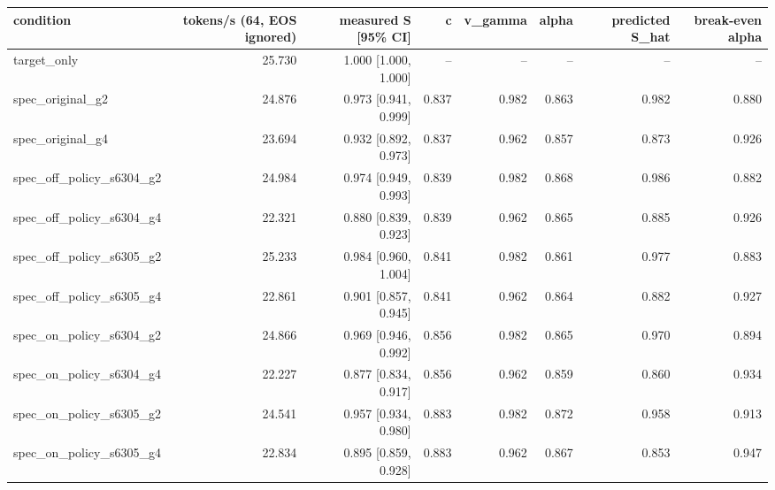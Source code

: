 \begin{tabular}{lrrrrrrr}
\toprule
condition & tokens/s (64, EOS ignored) & measured S [95\% CI] & c & v\_gamma & alpha & predicted S\_hat & break-even alpha \\
\midrule
target\_only & 25.730 & 1.000 [1.000, 1.000] & -- & -- & -- & -- & -- \\
spec\_original\_g2 & 24.876 & 0.973 [0.941, 0.999] & 0.837 & 0.982 & 0.863 & 0.982 & 0.880 \\
spec\_original\_g4 & 23.694 & 0.932 [0.892, 0.973] & 0.837 & 0.962 & 0.857 & 0.873 & 0.926 \\
spec\_off\_policy\_s6304\_g2 & 24.984 & 0.974 [0.949, 0.993] & 0.839 & 0.982 & 0.868 & 0.986 & 0.882 \\
spec\_off\_policy\_s6304\_g4 & 22.321 & 0.880 [0.839, 0.923] & 0.839 & 0.962 & 0.865 & 0.885 & 0.926 \\
spec\_off\_policy\_s6305\_g2 & 25.233 & 0.984 [0.960, 1.004] & 0.841 & 0.982 & 0.861 & 0.977 & 0.883 \\
spec\_off\_policy\_s6305\_g4 & 22.861 & 0.901 [0.857, 0.945] & 0.841 & 0.962 & 0.864 & 0.882 & 0.927 \\
spec\_on\_policy\_s6304\_g2 & 24.866 & 0.969 [0.946, 0.992] & 0.856 & 0.982 & 0.865 & 0.970 & 0.894 \\
spec\_on\_policy\_s6304\_g4 & 22.227 & 0.877 [0.834, 0.917] & 0.856 & 0.962 & 0.859 & 0.860 & 0.934 \\
spec\_on\_policy\_s6305\_g2 & 24.541 & 0.957 [0.934, 0.980] & 0.883 & 0.982 & 0.872 & 0.958 & 0.913 \\
spec\_on\_policy\_s6305\_g4 & 22.834 & 0.895 [0.859, 0.928] & 0.883 & 0.962 & 0.867 & 0.853 & 0.947 \\
\bottomrule
\end{tabular}
